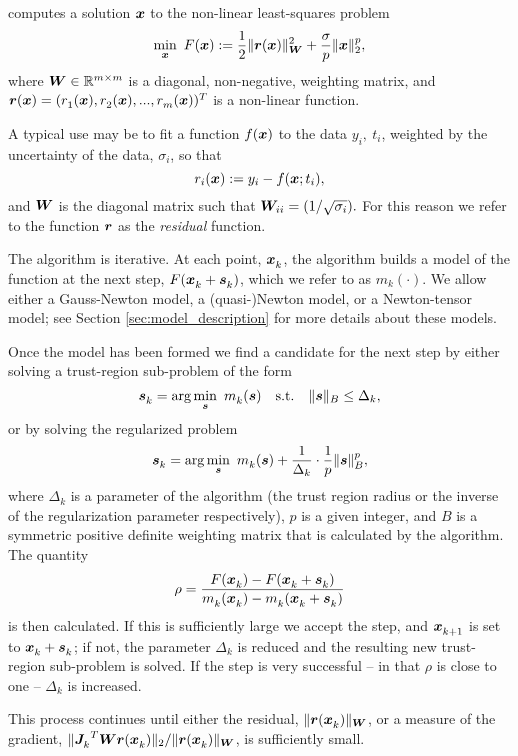 {\tt \fullpackagename} computes a solution $\vx$ to the non-linear least-squares problem
\begin{equation}
\min_\vx \  F(\vx) := \frac{1}{2}\| \vr(\vx) \|_{\vW}^2 + \frac{\sigma}{p}\| \vx\|_2^p,
\label{eq:nlls_problem}
\end{equation}
where $\vW\in\mathbb{R}^{m\times m}$ is a diagonal, non-negative, weighting matrix, and $\vr(\vx) =(\comp[1]{r}(\vx), \comp[2]{r}(\vx),...,\comp[m]{r}(\vx))^T$ is a non-linear function.

A typical use may be to fit a function $f(\vx)$ to the data $y_i, \ t_i$, weighted by the uncertainty of the data, $\sigma_i$, so that
$$r_i(\vx) := y_i - f(\vx;t_i),$$
and $\vW$ is the diagonal matrix such that $\vW_{ii} = (1/\sqrt{\sigma_i}).$  For this reason
we refer to the function $\vr$ as the \emph{residual} function.

The algorithm is iterative.
At each point, $\iter{\vx}$, the algorithm builds a model of the function at the next step, $F({\iter{\vx}+\iter{\vs}})$, which we refer to as $m_k(\cdot)$.  We allow either a Gauss-Newton model, a (quasi-)Newton model, or a Newton-tensor model; see Section \ref{sec:model_description} for more details about these models.

Once the model has been formed we find a candidate for the next step by either solving a trust-region sub-problem of the form
\begin{equation}
\iter{\vs} = \arg \min_{\vs} \ \iter{m} (\vs) \quad \mathrm{s.t.} \quad  \|\vs\|_B \leq \Delta_k,\label{eq:tr_subproblem}
\end{equation}
or by solving the regularized problem
\begin{equation}
\iter{\vs} = \arg \min_{\vs} \ \iter{m} (\vs)  + \frac{1}{\Delta_k}\cdot \frac{1}{p} \|\vs\|_B^p,\label{eq:reg_subproblem}
\end{equation}
where $\Delta_k$ is a parameter of the algorithm (the trust region radius or the inverse of the regularization parameter respectively), $p$ is a given integer, and $B$ is a symmetric positive definite weighting matrix that is calculated by the algorithm.
The quantity
\[\rho = \frac{F(\iter{\vx}) - F(\iter{\vx} + \iter{\vs})}{\iter{m}(\iter{\vx}) - \iter{m}(\iter{\vx} + \iter{\vs})}\]
is then calculated.
If this is sufficiently large we accept the step, and $\iter[k+1]{\vx}$ is set to $\iter{\vx} + \iter{\vs}$; if not, the parameter $\Delta_k$
is reduced and  the resulting new trust-region sub-problem is solved.  If the step is very successful -- in that $\rho$ is close to one --
$\Delta_k$ is increased.

This process continues until either the residual, $\|\vr(\iter{\vx})\|_\vW$, or a measure of the gradient,
$\|{\iter{\vJ}}^T\vW\vr(\iter{\vx})\|_2 / \|\vr(\iter{\vx})\|_\vW$, is sufficiently small.


